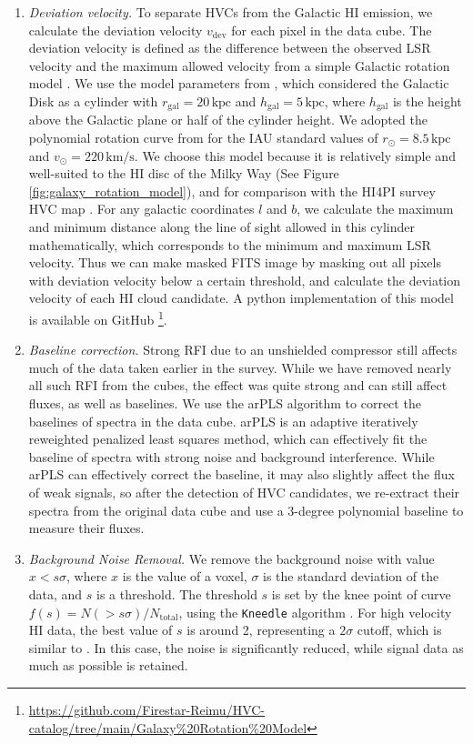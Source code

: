 \documentclass[twocolumn,trackchanges]{aastex701}
\begin{document}
\begin{enumerate}
    \item \textit{Deviation velocity.} To separate HVCs from the Galactic HI emission, we calculate the deviation velocity $v_\mathrm{dev}$ for each pixel in the data cube. The deviation velocity is defined as the difference between the observed LSR velocity and the maximum allowed velocity from a simple Galactic rotation model \citep{1991A&A...250..499W}. We use the model parameters from \citet{2018MNRAS.474..289W}, which considered the Galactic Disk as a cylinder with $r_\mathrm{gal} = 20\,\mathrm{kpc}$ and $h_\mathrm{gal} = 5\,\mathrm{kpc}$, where $h_\mathrm{gal}$ is the height above the Galactic plane or half of the cylinder height. We adopted the polynomial rotation curve from \cite{1985ApJ...295..422C} for the IAU standard values of $r_\odot = 8.5\,\mathrm{kpc}$ and $v_\odot = 220\,\mathrm{km/s}$. We choose this model because it is relatively simple and well-suited to the HI disc of the Milky Way (See Figure \ref{fig:galaxy_rotation_model}), and for comparison with the HI4PI survey HVC map \citep{2018MNRAS.474..289W}. For any galactic coordinates $l$ and $b$, we calculate the maximum and minimum distance along the line of sight allowed in this cylinder mathematically, which corresponds to the minimum and maximum LSR velocity. Thus we can make masked FITS image by masking out all pixels with deviation velocity below a certain threshold, and calculate the deviation velocity of each HI cloud candidate. A python implementation of this model is available on GitHub \footnote{\url{https://github.com/Firestar-Reimu/HVC-catalog/tree/main/Galaxy\%20Rotation\%20Model}}.
    \item \textit{Baseline correction.} Strong RFI due to an unshielded compressor still affects much of the data taken earlier in the survey. While we have removed nearly all such RFI from the cubes, the effect was quite strong and can still affect fluxes, as well as baselines. We use the arPLS algorithm \citep{2015Ana...140..250B} to correct the baselines of spectra in the data cube. arPLS is an adaptive iteratively reweighted penalized least squares method, which can effectively fit the baseline of spectra with strong noise and background interference. While arPLS can effectively correct the baseline, it may also slightly affect the flux of weak signals, so after the detection of HVC candidates, we re-extract their spectra from the original data cube and use a 3-degree polynomial baseline to measure their fluxes.
    \item \textit{Background Noise Removal.} We remove the background noise with value $x < s\sigma$, where $x$ is the value of a voxel, $\sigma$ is the standard deviation of the data, and $s$ is a threshold. The threshold $s$ is set by the knee point of curve $f(s) = N(> s\sigma)/N_\mathrm{total}$, using the \texttt{Kneedle} algorithm \citep{satopaa2011finding}. For high velocity HI data, the best value of $s$ is around 2, representing a $2\sigma$ cutoff, which is similar to \citet{2020ApJ...898...80Y}. In this case, the noise is significantly reduced, while signal data as much as possible is retained.
\end{enumerate}
\end{document}
